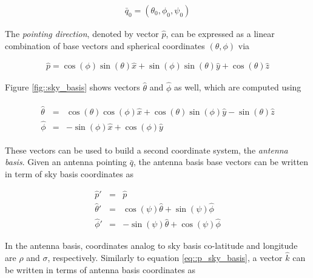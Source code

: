 \documentclass[a4paper,fleqn]{cas-dc}\sloppy
\begin{document}
\begin{equation}
\begin{aligned}
\bar{q}_0= (\theta_0,\phi_0,\psi_0)
\end{aligned}
\end{equation}

The \textsl{pointing direction}, denoted by vector $\hat{p}$, can be expressed as a linear combination of base vectors and spherical coordinates $(\theta,\phi)$ via

\begin{equation}
\begin{aligned}
\hat{p} = \cos(\phi)\sin(\theta)\hat{x} + \sin(\phi)\sin(\theta) \hat{y} + \cos(\theta) \hat{z}
\end{aligned}
\label{eq::p_sky_basis}
\end{equation}

Figure \ref{fig::sky_basis} shows vectors $\hat{\theta}$ and $\hat{\phi}$ as well, which are computed using

\begin{eqnarray}
\begin{aligned}
\hat{\theta} &=&  \cos(\theta) \cos(\phi) \hat{x} + \cos(\theta)\sin(\phi) \hat{y} - \sin(\theta) \hat{z} \\
\hat{\phi}   &=&              -\sin(\phi) \hat{x} +             \cos(\phi) \hat{y}
\end{aligned}
\label{eq::tangent_sky_basis}
\end{eqnarray}

These vectors can be used to build a second coordinate system, the \textsl{antenna basis}. Given an antenna pointing $\bar{q}$, the antenna basis base vectors can be written in term of sky basis coordinates as 

\begin{eqnarray}
\hat{p}'      &=&  \hat{p} \\
\hat{\theta}' &=&  \cos(\psi)\hat{\theta} + \sin(\psi)\hat{\phi} \\
\hat{\phi}'   &=& -\sin(\psi)\hat{\theta} + \cos(\psi)\hat{\phi}
\label{eq::antenna_base_vectors}
\end{eqnarray}

In the antenna basis, coordinates analog to sky basis co-latitude and longitude are $\rho$ and $\sigma$, respectively. Similarly to equation \ref{eq::p_sky_basis}, a vector $\hat{k}$ can be written in terms of antenna basis coordinates as
\end{document}
